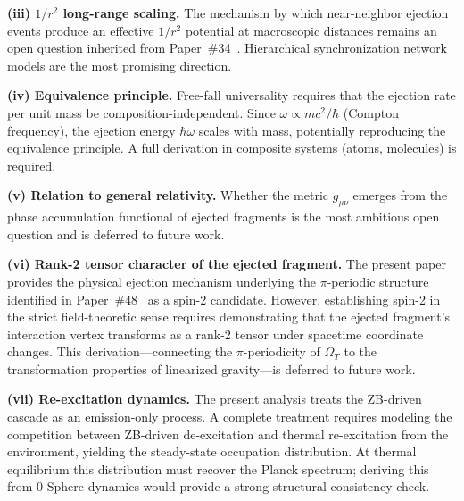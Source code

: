 \documentclass[%
 reprint, amsmath,amssymb, aps, prb, ]{revtex4-2}
\numberwithin{equation}{section}
\begin{document}
\textbf{(iii) $1/r^2$ long-range scaling.} The mechanism by which near-neighbor ejection events produce an effective $1/r^2$ potential at macroscopic distances remains an open question inherited from Paper~\#34~\cite{hanamura34}. Hierarchical synchronization network models are the most promising direction.

\textbf{(iv) Equivalence principle.} Free-fall universality requires that the ejection rate per unit mass be composition-independent. Since $\omega \propto mc^2/\hbar$ (Compton frequency), the ejection energy $\hbar\omega$ scales with mass, potentially reproducing the equivalence principle. A full derivation in composite systems (atoms, molecules) is required.

\textbf{(v) Relation to general relativity.} Whether the metric $g_{\mu\nu}$ emerges from the phase accumulation functional of ejected fragments is the most ambitious open question and is deferred to future work.

\textbf{(vi) Rank-2 tensor character of the ejected fragment.} The present paper provides the physical ejection mechanism underlying the $\pi$-periodic structure identified in Paper~\#48~\cite{hanamura48} as a spin-2 candidate. However, establishing spin-2 in the strict field-theoretic sense requires demonstrating that the ejected fragment's interaction vertex transforms as a rank-2 tensor under spacetime coordinate changes. This derivation---connecting the $\pi$-periodicity of $\Omega_T$ to the transformation properties of linearized gravity---is deferred to future work.

\textbf{(vii) Re-excitation dynamics.} The present analysis treats the ZB-driven cascade as an emission-only process. A complete treatment requires modeling the competition between ZB-driven de-excitation and thermal re-excitation from the environment, yielding the steady-state occupation distribution. At thermal equilibrium this distribution must recover the Planck spectrum; deriving this from 0-Sphere dynamics would provide a strong structural consistency check.
\end{document}
